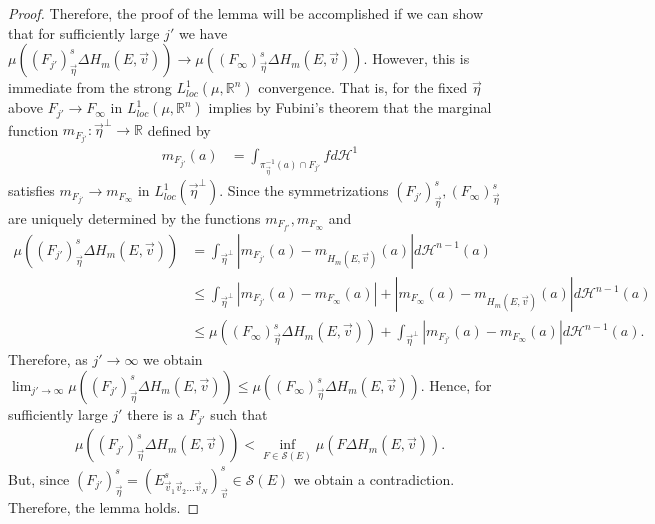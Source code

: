 \documentclass[12pt]{amsart}
\numberwithin{equation}{section}
\theoremstyle{plain}
\theoremstyle{definition}
\begin{document}
\begin{proof}
Therefore, the proof of the lemma will be accomplished if we can show that for sufficiently large $j'$ we have $\mu((F_{j'})^s_{\vec{\eta}} \Delta H_m(E, \vec{v})) \rightarrow \mu((F_{\infty})^s_{\vec{\eta}} \Delta H_m(E, \vec{v}))$.  However, this is immediate from the strong $L^1_{loc}(\mu, \mathbb{R}^n)$ convergence.  That is, for the fixed $\vec{\eta}$ above $F_{j'} \rightarrow F_{\infty}$ in  $L^1_{loc}(\mu, \mathbb{R}^n)$ implies by Fubini's theorem that the marginal function $m_{F_{j'}}: \vec{\eta}^{\perp} \rightarrow \mathbb{R}$ defined by 
\begin{align*}
    m_{F_{j'}}(a) & = \int_{\pi_{\vec{\eta}}^{-1}(a) \cap F_{j'}} f d\mathcal{H}^1
\end{align*}
satisfies $m_{F_{j'}} \rightarrow m_{F_{\infty}}$ in $L^1_{loc}(\vec{\eta}^{\perp})$.  Since the symmetrizations $(F_{j'})^s_{\vec{\eta}}, (F_{\infty})^s_{\vec{\eta}}$ are uniquely determined by the functions $m_{F_{f'}}, m_{F_{\infty}}$ and 
\begin{align*}
    \mu((F_{j'})^s_{\vec{\eta}} \Delta H_m(E, \vec{v})) & = \int_{\vec{\eta}^\perp} |m_{F_{j'}}(a) - m_{H_m(E, \vec{v})}(a)| d\mathcal{H}^{n-1}(a)\\
    & \le \int_{\vec{\eta}^\perp} |m_{F_{j'}}(a) - m_{F_{\infty}}(a)| + |m_{F_{\infty}}(a) -  m_{H_m(E, \vec{v})}(a)| d\mathcal{H}^{n-1}(a)\\
    & \le \mu((F_{\infty})^s_{\vec{\eta}} \Delta H_m(E, \vec{v})) + \int_{\vec{\eta}^\perp} |m_{F_{j'}}(a) - m_{F_{\infty}}(a)|d\mathcal{H}^{n-1}(a).
\end{align*}
Therefore, as $j' \rightarrow \infty$ we obtain $\lim_{j' \rightarrow \infty} \mu((F_{j'})^s_{\vec{\eta}} \Delta H_m(E, \vec{v})) \le \mu((F_{\infty})^s_{\vec{\eta}} \Delta H_m(E, \vec{v}))$. Hence, for sufficiently large $j'$ there is a $F_{j'}$ such that 
\begin{align*}
    \mu((F_{j'})^s_{\vec{\eta}} \Delta H_m(E, \vec{v}))< \inf_{F \in \mathcal{S}(E)} \mu(F \Delta H_m(E, \vec{v})).
\end{align*}
But, since $(F_{j'})^s_{\vec{\eta}} = (E^s_{\vec{v}_1\vec{v}_2...\vec{v}_N})^s_{\vec{v}} \in \mathcal{S}(E)$ we obtain a contradiction.  Therefore, the lemma holds.
\end{proof}
\end{document}
